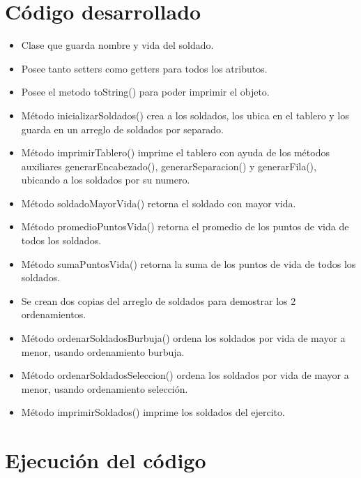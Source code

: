\documentclass{article}
\begin{document}
\section{Código desarrollado}

\begin{itemize}
	\item Clase que guarda nombre y vida del soldado.
	\item Posee tanto setters como getters para todos los atributos.
	\item Posee el metodo toString() para poder imprimir el objeto.
\end{itemize}
\pagebreak

\begin{itemize}
	\item Método inicializarSoldados() crea a los soldados, los ubica en el tablero y los guarda en un arreglo de soldados por separado.
	\item Método imprimirTablero() imprime el tablero con ayuda de los métodos auxiliares generarEncabezado(), generarSeparacion() y generarFila(), ubicando a los soldados por su numero.
	\item Método soldadoMayorVida() retorna el soldado con mayor vida.
	\item Método promedioPuntosVida() retorna el promedio de los puntos de vida de todos los soldados.
	\item Método sumaPuntosVida() retorna la suma de los puntos de vida de todos los soldados.
	\item Se crean dos copias del arreglo de soldados para demostrar los 2 ordenamientos.
	\item Método ordenarSoldadosBurbuja() ordena los soldados por vida de mayor a menor, usando ordenamiento burbuja.
	\item Método ordenarSoldadosSeleccion() ordena los soldados por vida de mayor a menor, usando ordenamiento selección.
	\item Método imprimirSoldados() imprime los soldados del ejercito.
\end{itemize}
\pagebreak

\section{Ejecución del código}

\pagebreak
\end{document}
